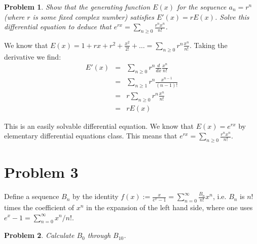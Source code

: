\documentclass[psamsfonts]{amsart}
\newtheorem{prob}{Problem}[section]
\newenvironment{sol}{{\bfseries Solution}}{\qedsymbol}
\theoremstyle{definition}
\theoremstyle{remark}
\numberwithin{equation}{section}
\begin{document}
\begin{prob}
Show that the generating function $E(x)$ for the sequence $a_n = r^n$ (where $r$ is some fixed complex number) satisfies $E'(x) = r E(x)$. Solve this differential equation to deduce that $e^{rx} = \sum_{n \geq 0} \frac{r^n x^n}{n!}$. 
\end{prob}

\begin{sol}
We know that $E(x) = 1 + rx + r^2 + \frac{x^2}{2!} + \ldots  = \sum_{n \geq 0} r^n \frac{x^n}{n!}$. Taking the derivative we find:
\begin{eqnarray}
E'(x) &=& \sum_{n \geq 0} r^n \frac{d}{dx} \frac{x^n}{n!} \\
&=& \sum_{n \geq 1} r^n \frac{x^{n-1}}{(n-1)!} \\
&=& r \sum_{n \geq 0} r^{n} \frac{x^{n}}{n!} \\
&=& r E(x)
\end{eqnarray}

This is an easily solvable differential equation. We know that $E(x) = e^{rx}$ by elementary differential equations class. This means that $e^{rx} = \sum_{n \geq 0} \frac{r^n x^n}{n!}$. 
\end{sol}

\section{Problem 3}

Define a sequence $B_n$ by the identity $f(x) := \frac{x}{e^x - 1} = \sum_{n=0}^\infty \frac{B_n}{n!} x^n$, i.e. $B_n$ is $n!$ times the coefficient of $x^n$ in the expansion of the left hand side, where one uses $e^{x} - 1 = \sum_{n=0}^\infty x^n/ n!$. 

\begin{prob}
Calculate $B_0$ through $B_{10}$. 
\end{prob}
\end{document}
